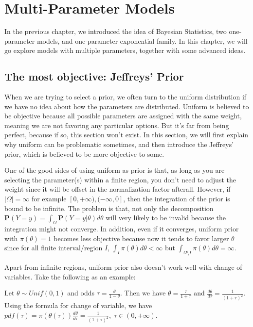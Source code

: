 \chapter{Multi-Parameter Models}
In the previous chapter, we introduced the idea of Bayesian Statistics, two one-parameter models, and one-parameter exponential family. In this chapter, we will go explore models with multiple parameters, together with some advanced ideas. 

\section{The most objective: Jeffreys' Prior}
When we are trying to select a prior, we often turn to the uniform distribution if we have no idea about how the parameters are distributed. Uniform is believed to be objective because all possible parameters are assigned with the same weight, meaning we are not favoring any particular options. But it's far from being perfect, because if so, this section won't exist. In this section, we will first explain why uniform can be problematic sometimes, and then introduce the Jeffreys' prior, which is believed to be more objective to some.

One of the good sides of using uniform as prior is that, as long as you are selecting the parameter(s) within a finite region, you don't need to adjust the weight since it will be offset in the normalization factor afterall. However, if $|\Omega| = \infty$ for example $[0, +\infty), (-\infty, 0]$, then the integration of the prior is bound to be infinite. The problem is that, not only the decomposition $\mathbf{P}(Y=y) = \int_{\Omega} \mathbf{P}(Y=y|\theta) d\theta$ will very likely to be invalid because the integration might not converge. In addition, even if it converges, uniform prior with $\pi(\theta) = 1$ becomes less objective because now it tends to favor larger $\theta$ since for all finite interval/region $I$, $\int_{I} \pi(\theta) d\theta < \infty$ but $\int_{\Omega\setminus I}\pi(\theta)d\theta = \infty$. 

Apart from infinite regions, uniform prior also doesn't work well with change of variables. Take the following as an example:
\begin{example}
    Let $\theta \sim Unif(0,1)$ and odds $\tau = \frac{\theta}{1-\theta}$. Then we have $\theta = \frac{\tau}{1+\tau}$ and $\frac{d\theta}{d\tau} = \frac{1}{(1+\tau)^2}$. Using the formula for  change of variable, we have $pdf(\tau) = \pi(\theta(\tau))\frac{d\theta}{d\tau} = \frac{1}{(1+\tau)^2},\; \tau \in (0, +\infty)$.
\end{example}


